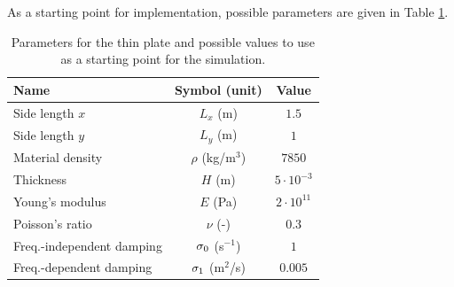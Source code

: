 As a starting point for implementation, possible parameters are given in Table \ref{tab:thinPlateParams}.
\begin{table}[h]
    \begin{center}
    \begin{tabular}{|l|c|c|}
        \hline
        Name & Symbol (unit) & Value\\ \hline
        Side length $x$ & $L_x$ (m) & $1.5$\\
        Side length $y$  & $L_y$ (m) & $1$\\
        Material density & $\rho$ (kg/m$^3$) & $7850$\\
        Thickness & $H$ (m) & $5\cdot10^{-3}$\\
        Young's modulus & $E$ (Pa) & $2\cdot10^{11}$\\
        Poisson's ratio & $\nu$ (-)& $0.3$\\
        Freq.-independent damping & $\sigma_{0}$ (s$^{-1}$) & $1$\\
        Freq.-dependent damping & $\sigma_{1}$ (m$^2$/s) & $0.005$\\\hline
    \end{tabular}
    \caption{Parameters for the thin plate and possible values to use as a starting point for the simulation.\label{tab:thinPlateParams}}
    \end{center}
\end{table}
